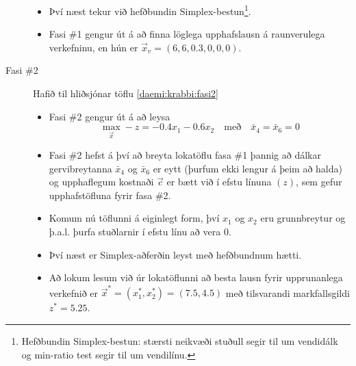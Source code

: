 \begin{lausn}
\begin{description}
\begin{itemize}
 \item Því næst tekur við hefðbundin Simplex-bestun\footnote{Hefðbundin Simplex-bestun: stærsti neikvæði stuðull segir til um vendidálk og min-ratio test segir til um vendilínu.}. 
 \item Fasi \#1 gengur út á að finna löglega upphafslausn á raunverulega verk\-efninu, en hún er $\vec{x}_v=(6,6,0.3,0,0,0)$.
\end{itemize} 
\item[Fasi \#2] Hafið til hliðsjónar töflu \ref{daemi:krabbi:fasi2}
\begin{itemize}
 \item Fasi \#2 gengur út á að leysa
$$\max_{\vec{x}} -z=-0.4x_1-0.6x_2\quad\textrm{með}\quad \bar{x}_4=\bar{x}_6=0$$ 
\item Fasi \#2 hefst á því að breyta lokatöflu fasa \#1 þannig að dálkar gervibreytanna $\bar{x}_4$ og $\bar{x}_6$ er eytt (þurfum ekki lengur á þeim að halda) og upphaflegum kostnaði $\vec{c}$ er bætt við í efstu línuna $(z)$, sem gefur upphafstöfluna fyrir fasa \#2. 
 \item Komum nú töflunni á eiginlegt form, því $x_1$ og $x_2$ eru grunnbreytur og þ.a.l. þurfa stuðlarnir í efstu línu að vera 0. 
 \item Því næst er Simplex-aðferðin leyst með hefðbundnum hætti. 
 \item Að lokum lesum við úr lokatöflunni að besta lausn fyrir upprunanlega verkefnið er $\vec{x}^*=(x_1^*,x_2^*)=(7.5,4.5)$ með tilsvarandi markfallsgildi $z^*=5.25$.
\end{itemize}
\end{description}



\end{lausn}
